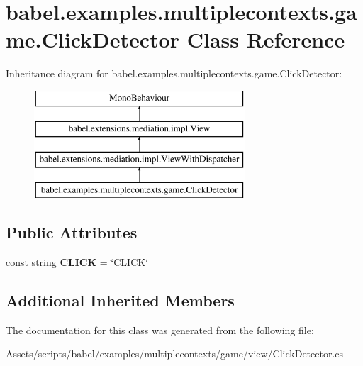 \hypertarget{classbabel_1_1examples_1_1multiplecontexts_1_1game_1_1_click_detector}{\section{babel.\-examples.\-multiplecontexts.\-game.\-Click\-Detector Class Reference}
\label{classbabel_1_1examples_1_1multiplecontexts_1_1game_1_1_click_detector}
}
Inheritance diagram for babel.\-examples.\-multiplecontexts.\-game.\-Click\-Detector\-:\begin{figure}[H]
\begin{center}
\leavevmode
\includegraphics[height=4.000000cm]{classbabel_1_1examples_1_1multiplecontexts_1_1game_1_1_click_detector}
\end{center}
\end{figure}
\subsection*{Public Attributes}
\begin{DoxyCompactItemize}
\item 
\hypertarget{classbabel_1_1examples_1_1multiplecontexts_1_1game_1_1_click_detector_a821762a5d3eecab4e2daa35ddae55f1c}{const string {\bfseries C\-L\-I\-C\-K} = \char`\"{}C\-L\-I\-C\-K\char`\"{}}\label{classbabel_1_1examples_1_1multiplecontexts_1_1game_1_1_click_detector_a821762a5d3eecab4e2daa35ddae55f1c}

\end{DoxyCompactItemize}
\subsection*{Additional Inherited Members}


The documentation for this class was generated from the following file\-:\begin{DoxyCompactItemize}
\item 
Assets/scripts/babel/examples/multiplecontexts/game/view/Click\-Detector.\-cs\end{DoxyCompactItemize}
